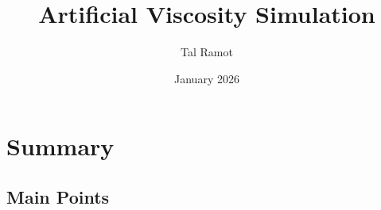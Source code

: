 \documentclass[11pt]{article}
\title{Artificial Viscosity Simulation}
\author{Tal Ramot}
\date{January 2026}
\begin{document}
\maketitle

\section{Summary}
\subsection{Main Points}
\end{document}
